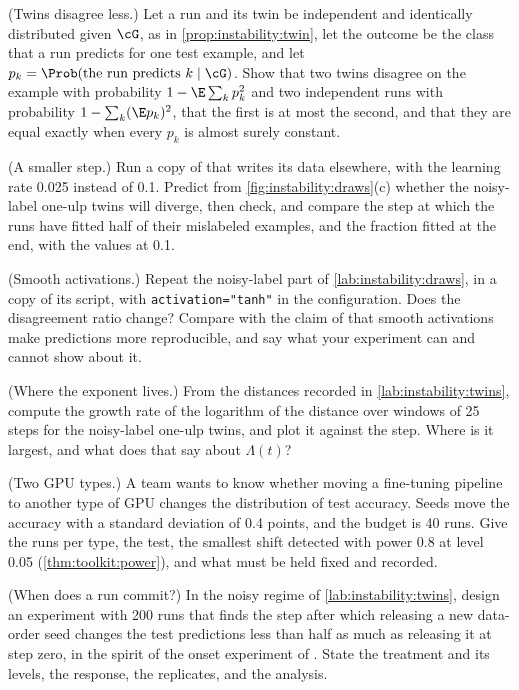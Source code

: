 \begin{refsection}
\begin{exercises}
\item \consolidation (Twins disagree less.) Let a run and its twin be independent and identically distributed given $\cG$, as in \cref{prop:instability:twin}, let the outcome be the class that a run predicts for one test example, and let $p_k=\Prob(\text{the run predicts }k\mid\cG)$. Show that two twins disagree on the example with probability $1-\E\sum_kp_k^2$ and two independent runs with probability $1-\sum_k(\E p_k)^2$, that the first is at most the second, and that they are equal exactly when every $p_k$ is almost surely constant.\label{ex:instability:churn}

\item \labwork (A smaller step.) Run a copy of  that writes its data elsewhere, with the learning rate 0.025 instead of 0.1. Predict from \cref{fig:instability:draws}(c) whether the noisy-label one-ulp twins will diverge, then check, and compare the step at which the runs have fitted half of their mislabeled examples, and the fraction fitted at the end, with the values at 0.1.

\item \labwork (Smooth activations.) Repeat the noisy-label part of \cref{lab:instability:draws}, in a copy of its script, with \texttt{activation="tanh"} in the configuration. Does the disagreement ratio change? Compare with the claim of \textcite{ShamirEtAl2020} that smooth activations make predictions more reproducible, and say what your experiment can and cannot show about it.

\item \labwork (Where the exponent lives.) From the distances recorded in \cref{lab:instability:twins}, compute the growth rate of the logarithm of the distance over windows of 25 steps for the noisy-label one-ulp twins, and plot it against the step. Where is it largest, and what does that say about $\Lambda(t)$?

\item \design (Two GPU types.) A team wants to know whether moving a fine-tuning pipeline to another type of GPU changes the distribution of test accuracy. Seeds move the accuracy with a standard deviation of 0.4 points, and the budget is 40 runs. Give the runs per type, the test, the smallest shift detected with power 0.8 at level 0.05 (\cref{thm:toolkit:power}), and what must be held fixed and recorded.

\item \design (When does a run commit?) In the noisy regime of \cref{lab:instability:twins}, design an experiment with 200 runs that finds the step after which releasing a new data-order seed changes the test predictions less than half as much as releasing it at step zero, in the spirit of the onset experiment of \textcite{SummersDinneen2021}. State the treatment and its levels, the response, the replicates, and the analysis.


\end{exercises}
\end{refsection}
